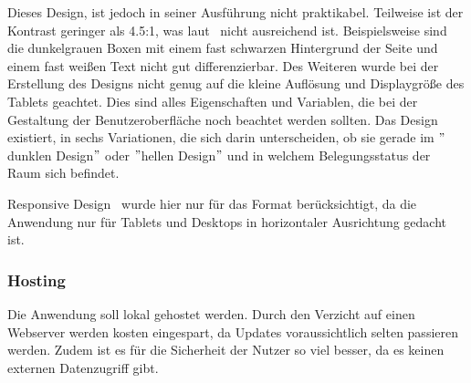 Dieses Design, ist jedoch in seiner Ausführung nicht praktikabel.
Teilweise ist der Kontrast geringer als 4.5:1, was laut~\cite{WCAG} nicht ausreichend ist.
Beispielsweise sind die dunkelgrauen Boxen mit einem fast schwarzen Hintergrund der Seite und einem fast weißen Text nicht gut differenzierbar.
Des Weiteren wurde bei der Erstellung des Designs nicht genug auf die kleine Auflösung und Displaygröße des Tablets geachtet.
Dies sind alles Eigenschaften und Variablen, die bei der Gestaltung der Benutzeroberfläche noch beachtet werden sollten.
\newline
Das Design existiert, in sechs Variationen, die sich darin unterscheiden, ob sie gerade im \("\)dunklen Design\("\) oder \("\)hellen Design\("\) und in welchem Belegungsstatus der Raum sich befindet.
\newline
{}

\gls{Responsive Design}~\cite{ResponsiveWebDesign} wurde hier nur für das Format berücksichtigt, da die Anwendung nur für Tablets und Desktops in horizontaler Ausrichtung gedacht ist.
\subsubsection{Hosting}\label{subsubsec:hosting}
Die Anwendung soll lokal gehostet werden.
Durch den Verzicht auf einen Webserver werden kosten eingespart, da Updates voraussichtlich selten passieren werden.
Zudem ist es für die Sicherheit der Nutzer so viel besser, da es keinen externen Datenzugriff gibt.
